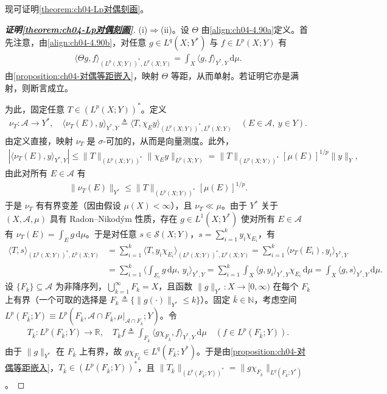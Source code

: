\documentclass[../../main.tex]{subfiles}%
\begin{document}
现可证明\cref{theorem:ch04-Lp对偶刻画}。

\begin{proof}[\textbf{证明\cref{theorem:ch04-Lp对偶刻画}}]
(i)$\Rightarrow$(ii)。设 $\Theta$ 由\eqref{align:ch04-4.90a}定义。首先注意，由\eqref{align:ch04-4.90b}，对任意 $g\in L^q(X;Y^*)$ 与 $f\in L^p(X;Y)$ 有
\begin{align}
\langle\Theta g,f\rangle_{(L^p(X;Y))^*,L^p(X;Y)}=\int_X\langle g,f\rangle_{Y^*,Y}\,\mathrm{d}\mu. \label{align:ch04-4.97}
\end{align}
由\cref{proposition:ch04-对偶等距嵌入}，映射 $\Theta$ 等距，从而单射。若证明它亦是满射，则断言成立。

为此，固定任意 $T\in(L^p(X;Y))^*$。定义
\begin{align*}
\nu_T:\mathcal{A}\to Y^*,\quad \langle\nu_T(E),y\rangle_{Y^*,Y}\triangleq\langle T,\chi_Ey\rangle_{(L^p(X;Y))^*,L^p(X;Y)}\quad(E\in\mathcal{A},\ y\in Y).
\end{align*}
由定义直接，映射 $\nu_T$ 是 $\sigma$-可加的，从而是向量测度。此外，
\begin{align*}
|\langle\nu_T(E),y\rangle_{Y^*,Y}|\leqslant\|T\|_{(L^p(X;Y))^*}\|\chi_Ey\|_{L^p(X;Y)}=\|T\|_{(L^p(X;Y))^*}[\mu(E)]^{1/p}\|y\|_Y,
\end{align*}
由此对所有 $E\in\mathcal{A}$ 有
\begin{align*}
\|\nu_T(E)\|_{Y^*}\leqslant\|T\|_{(L^p(X;Y))^*}[\mu(E)]^{1/p}.
\end{align*}
于是 $\nu_T$ 有有界变差（因由假设 $\mu(X)<\infty$），且 $\nu_T\ll\mu$。由于 $Y^*$ 关于 $(X,\mathcal{A},\mu)$ 具有 Radon--Nikodým 性质，存在 $g\in L^1(X;Y^*)$ 使对所有 $E\in\mathcal{A}$ 有 $\nu_T(E)=\int_E g\,\mathrm{d}\mu$。于是对任意 $s\in\mathcal{S}(X;Y)$，$s=\sum_{i=1}^ky_i\chi_{E_i}$，有
\begin{align}
\langle T,s\rangle_{(L^p(X;Y))^*,L^p(X;Y)}
&=\sum_{i=1}^k\langle T,y_i\chi_{E_i}\rangle_{(L^p(X;Y))^*,L^p(X;Y)}
=\sum_{i=1}^k\langle\nu_T(E_i),y_i\rangle_{Y^*,Y}\nonumber\\
&=\sum_{i=1}^k\Big\langle\int_{E_i}g\,\mathrm{d}\mu,\,y_i\Big\rangle_{Y^*,Y}
=\sum_{i=1}^k\int_X\langle g,y_i\rangle_{Y^*,Y}\chi_{E_i}\,\mathrm{d}\mu
=\int_X\langle g,s\rangle_{Y^*,Y}\,\mathrm{d}\mu. \label{align:ch04-4.98}
\end{align}
设 $\{F_k\}\subseteq\mathcal{A}$ 为非降序列，$\bigcup_{k=1}^\infty F_k=X$，且函数 $\|g\|_{Y^*}:X\to[0,\infty)$ 在每个 $F_k$ 上有界（一个可取的选择是 $F_k\triangleq\{\|g(\cdot)\|_{Y^*}\leqslant k\}$）。固定 $\bar k\in\mathbb{N}$，考虑空间 $L^p(F_{\bar k};Y)\equiv L^p(F_{\bar k},\mathcal{A}\cap F_{\bar k},\mu|_{\mathcal{A}\cap F_{\bar k}};Y)$。令
\begin{align}
T_{\bar k}:L^p(F_{\bar k};Y)\to\mathbb{R},\quad T_{\bar k}f\triangleq\int_{F_{\bar k}}\langle g\chi_{F_{\bar k}},f\rangle_{Y^*,Y}\,\mathrm{d}\mu\quad(f\in L^p(F_{\bar k};Y)). \label{align:ch04-4.99}
\end{align}
由于 $\|g\|_{Y^*}$ 在 $F_{\bar k}$ 上有界，故 $g\chi_{F_{\bar k}}\in L^q(F_{\bar k};Y^*)$。于是由\cref{proposition:ch04-对偶等距嵌入}，$T_{\bar k}\in(L^p(F_{\bar k};Y))^*$，且 $\|T_{\bar k}\|_{(L^p(F_{\bar k};Y))^*}=\|g\chi_{F_{\bar k}}\|_{L^q(F_{\bar k};Y^*)}$。


\end{proof}
\end{document}
